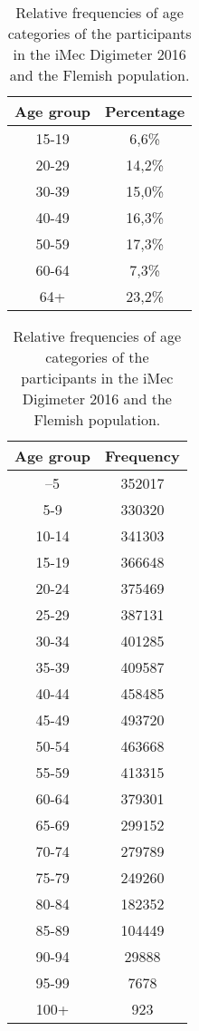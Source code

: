 \begin{table}
  \caption{Relative frequencies of age categories of the participants in the iMec Digimeter 2016 and the Flemish population.}
  \label{tab:frequenties-leeftijden}
  \centering
  \begin{tabular}{cc}
    \textbf{Age group} & \textbf{Percentage} \\ \midrule
    15-19 & 6,6\% \\
    20-29 & 14,2\% \\
    30-39 & 15,0\% \\
    40-49 & 16,3\% \\
    50-59 & 17,3\% \\
    60-64 & 7,3\% \\
    64+   & 23,2\% \\
  \end{tabular}
  \label{tab:digimeter2016}
  
  \centering
  \begin{tabular}{cc}
    \textbf{Age group} & \textbf{Frequency} \\ \midrule
    –5            &     352017      \\
    5-9           &     330320      \\
    10-14          &     341303      \\
    15-19          &     366648      \\
    20-24          &     375469      \\
    25-29          &     387131      \\
    30-34          &     401285      \\
    35-39          &     409587      \\
    40-44          &     458485      \\
    45-49          &     493720      \\
    50-54          &     463668      \\
    55-59          &     413315      \\
    60-64          &     379301      \\
    65-69          &     299152      \\
    70-74          &     279789      \\
    75-79          &     249260      \\
    80-84          &     182352      \\
    85-89          &     104449      \\
    90-94          &      29888      \\
    95-99          &      7678       \\
    100+           &       923
  \end{tabular}
  \label{tab:leeftijd-vlaanderen}
  
  
\end{table}

